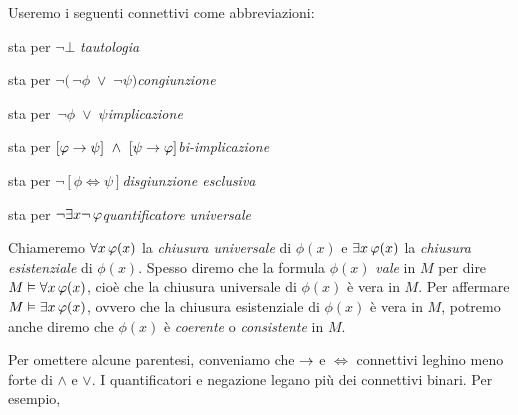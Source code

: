 Useremo i seguenti connettivi come abbreviazioni:\bigskip

\hspace*{8em}\llap{\emph{$\top$}}\hspace{2em} sta per\hspace{2em} $\neg\bot$ \hfill  \emph{tautologia}

\hspace*{8em}\llap{\emph{$\phi\wedge\psi$}}\hspace{2em} sta per\hspace{2em} $\neg\big(\,\neg\phi\;\vee\;\neg\psi\big)$\hfill  \emph{congiunzione}

\hspace*{8em}\llap{\emph{$\phi\imp\psi$}}\hspace{2em} sta per\hspace{2em} $\,\neg\phi\;\vee\;\psi$\hfill  \emph{implicazione}

\hspace*{8em}\llap{\emph{$\phi\iff\psi$}}\hspace{2em} sta per\hspace{2em}  $[\phi\imp\psi]\ \wedge\ [\psi\imp\phi]$\hfill   \emph{bi-implicazione}

\hspace*{8em}\llap{\emph{$\phi\niff\psi$}}\hspace{2em} sta per\hspace{2em}  $\neg[\phi\iff\psi]$\hfill   \emph{disgiunzione esclusiva}

\hspace*{8em}\hspace{2em} sta per\hspace{2em}  $\neg\exists x\neg\,\varphi$\hfill   \emph{quantificatore universale}\bigskip

Chiameremo $\forall x\,\varphi(x)$ la \emph{chiusura universale\/} di $\phi(x)$ e $\exists x\,\varphi(x)$ la \emph{chiusura esistenziale\/} di $\phi(x)$. Spesso diremo che la formula $\phi(x)$ \emph{vale\/} in $M$ per dire $M\vDash\forall x\,\varphi(x)$, cio\`e che la chiusura universale di $\phi(x)$ \`e vera in $M$. Per affermare $M\vDash\exists x\,\varphi(x)$, ovvero che la chiusura esistenziale di $\phi(x)$ \`e vera in $M$, potremo anche diremo che $\phi(x)$ \`e \emph{coerente\/} o \emph{consistente\/} in $M$. 

Per omettere alcune parentesi, conveniamo che $\rightarrow$ e $\iff$ connettivi leghino meno forte di $\wedge$ e $\vee$.  I quantificatori e negazione legano pi\`u dei connettivi binari. Per esempio,


